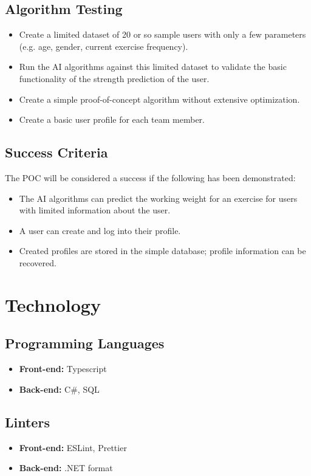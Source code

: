 \documentclass{article}
\begin{document}
	\subsection{Algorithm Testing}
	\begin{itemize}
		\item Create a limited dataset of 20 or so sample users with only a few parameters (e.g. age, gender, current exercise frequency).
		\item Run the AI algorithms against this limited dataset to validate the basic functionality of the strength prediction of the user.
		\item Create a simple proof-of-concept algorithm without extensive optimization.
		\item Create a basic user profile for each team member.
	\end{itemize}

	\subsection{Success Criteria}
	The POC will be considered a success if the following has been demonstrated:
	\begin{itemize}
		\item The AI algorithms can predict the working weight for an exercise for users with limited information about the user.
		\item A user can create and log into their profile.
		\item Created profiles are stored in the simple database; profile information can be recovered.
	\end{itemize}

	\section{Technology}

	\subsection{Programming Languages}
    \begin{itemize}
		\item \textbf{Front-end:} Typescript
		\item \textbf{Back-end:} C\#, SQL
	\end{itemize}

	\subsection{Linters}
    \begin{itemize}
		\item \textbf{Front-end:} ESLint, Prettier
		\item \textbf{Back-end:} .NET format
	\end{itemize}
\end{document}
